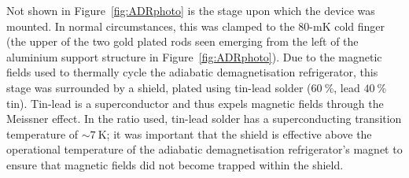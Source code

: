 \par 
Not shown in Figure~\ref{fig:ADRphoto} is the stage upon which the device was mounted. In normal circumstances, this was clamped to the 80-mK cold finger (the upper of the two gold plated rods seen emerging from the left of the aluminium support structure in Figure~\ref{fig:ADRphoto}). Due to the magnetic fields used to thermally cycle the adiabatic demagnetisation refrigerator, this stage was surrounded by a shield, plated using tin-lead solder ($60~\%$, lead $40~\%$ tin). Tin-lead is a superconductor and thus expels magnetic fields through the Meissner effect. In the ratio used, tin-lead solder has a superconducting transition temperature of $\sim 7~\mathrm{K}$; it was important that the shield is effective above the operational temperature of the adiabatic demagnetisation refrigerator's magnet to ensure that magnetic fields did not become trapped within the shield.
%
